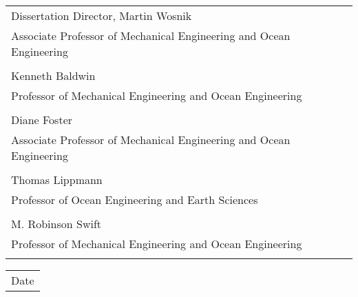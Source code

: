 \begin{flushright}

\begin{singlespace}
\tabletail
   {\hline {}\\}
\tablelasttail{}
\begin{supertabular}{p{13cm}}
      \hline
         Dissertation Director, Martin Wosnik \\
         Associate Professor of Mechanical Engineering and Ocean Engineering \\
         \vspace{8.5mm}\\
      \hline
         Kenneth Baldwin \\
         Professor of Mechanical Engineering and Ocean Engineering \\
         \vspace{8.5mm}\\
      \hline
         Diane Foster \\
         Associate Professor of Mechanical Engineering and Ocean Engineering \\
         \vspace{8.5mm}\\
      \hline
         Thomas Lippmann \\
         Professor of Ocean Engineering and Earth Sciences\\
         \vspace{8.5mm}\\
      \hline
        M. Robinson Swift \\
        Professor of Mechanical Engineering and Ocean Engineering\\
        \vspace{8.5mm}\\
    \end{supertabular}

    \begin{tabular*}{3in}{l}
      \hline
        Date
    \end{tabular*}

\end{singlespace}
\end{flushright}

